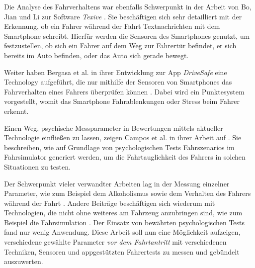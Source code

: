 Die Analyse des Fahrverhaltens war ebenfalls Schwerpunkt in der Arbeit von Bo, Jian und Li zur Software \textit{Texive} \cite{texive}. Sie beschäftigen sich sehr detailliert mit der Erkennung, ob ein Fahrer während der Fahrt Textnachrichten mit dem Smartphone schreibt. Hierfür werden die Sensoren des Smartphones genutzt, um festzustellen, ob sich ein Fahrer auf dem Weg zur Fahrertür befindet, er sich bereits im Auto befinden, oder das Auto sich gerade bewegt.

Weiter haben Bergasa et al. in ihrer Entwicklung zur App \textit{DriveSafe} eine Technology aufgeführt, die nur mithilfe der Sensoren von Smartphones das Fahrverhalten eines Fahrers überprüfen können \cite{drivesafe}. Dabei wird ein Punktesystem vorgestellt, womit das Smartphone Fahrablenkungen oder Stress beim Fahrer erkennt.

Einen Weg, psychische Messparameter in Bewertungen mittels aktueller Technologie einfließen zu lassen, zeigen Campos et al. in ihrer Arbeit auf \cite{drivingsimulations}. Sie beschreiben, wie auf Grundlage von psychologischen Tests Fahrszenarios im Fahrsimulator generiert werden, um die Fahrtauglichkeit des Fahrers in solchen Situationen zu testen.

Der Schwerpunkt vieler verwandter Arbeiten lag in der Messung einzelner Parameter, wie zum Beispiel dem Alkoholismus \cite{mobilesmarttracking,sobrietymobiletests} sowie dem Verhalten des Fahrers während der Fahrt \cite{smartphoneresearchplatform, texive, drivesafe}. Andere Beiträge beschäftigen sich wiederum mit Technologien, die nicht ohne weiteres am Fahrzeug anzubringen sind, wie zum Beispiel die Fahrsimulation \cite{drivingsimulations, interaktivefahrsimulation}. Der Einsatz von bewährten psychologischen Tests fand nur wenig Anwendung. Diese Arbeit soll nun eine Möglichkeit aufzeigen, verschiedene gewählte Parameter \textit{vor dem Fahrtantritt} mit verschiedenen Techniken, Sensoren und appgestützten Fahrertests zu messen und gebündelt auszuwerten.
